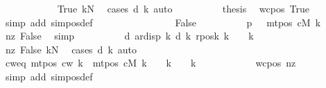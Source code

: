 \begin{isabellebody}
\ \ \ \ \ \ \ \ \ \ \isamarkupfalse%
\ True\ kN\ \isamarkupfalse%
\ {\isacharparenleft}{\kern0pt}cases\ {\isachardoublequoteopen}d\ k{\isachardoublequoteclose}{\isacharparenright}{\kern0pt}\ auto\isanewline
\ \ \ \ \ \ \ \ \isamarkupfalse%
\ {\isacharquery}{\kern0pt}thesis\ \isamarkupfalse%
\ wcpos\ True\ \isamarkupfalse%
\ {\isacharparenleft}{\kern0pt}simp\ add{\isacharcolon}{\kern0pt}\ sim{\isacharunderscore}{\kern0pt}pos{\isacharunderscore}{\kern0pt}def{\isacharparenright}{\kern0pt}\isanewline
\ \ \ \ \ \ \isamarkupfalse%
\isanewline
\ \ \ \ \ \ \ \ \isamarkupfalse%
\ False\isanewline
\ \ \ \ \ \ \ \ \isamarkupfalse%
\ p{}{\isacharcolon}{\kern0pt}\ {\isachardoublequoteopen}{}\ {\isasymle}\ mt{\isacharunderscore}{\kern0pt}pos\ cM\ k{\isachardoublequoteclose}\ \isamarkupfalse%
\ nz\ False\ \isamarkupfalse%
\ simp\isanewline
\ \ \ \ \ \ \ \ \isamarkupfalse%
\ d{}{\isacharcolon}{\kern0pt}\ {\isachardoublequoteopen}ar{\isacharunderscore}{\kern0pt}disp\ {\isacharquery}{\kern0pt}k\ {\isacharparenleft}{\kern0pt}d\ k{\isacharparenright}{\kern0pt}\ {\isacharparenleft}{\kern0pt}{\isacharquery}{\kern0pt}rposk\ k{\isacharparenright}{\kern0pt}\ {\isasymle}\ {}\ {\isacharasterisk}{\kern0pt}\ {\isacharquery}{\kern0pt}k{\isachardoublequoteclose}\isanewline
\ \ \ \ \ \ \ \ \ \ \isamarkupfalse%
\ nz\ False\ kN\ \isamarkupfalse%
\ {\isacharparenleft}{\kern0pt}cases\ {\isachardoublequoteopen}d\ k{\isachardoublequoteclose}{\isacharparenright}{\kern0pt}\ auto\isanewline
\ \ \ \ \ \ \ \ \isamarkupfalse%
\ cw{\isacharunderscore}{\kern0pt}eq{\isacharcolon}{\kern0pt}\ {\isachardoublequoteopen}mt{\isacharunderscore}{\kern0pt}pos\ c{\isacharunderscore}{\kern0pt}w\ k\ {\isacharequal}{\kern0pt}\ {\isacharparenleft}{\kern0pt}mt{\isacharunderscore}{\kern0pt}pos\ cM\ k\ {\isacharminus}{\kern0pt}\ {}{\isacharparenright}{\kern0pt}\ {\isacharasterisk}{\kern0pt}\ {\isacharquery}{\kern0pt}k\ {\isacharplus}{\kern0pt}\ {}\ {\isacharplus}{\kern0pt}\ {\isacharquery}{\kern0pt}k{\isachardoublequoteclose}\isanewline
\ \ \ \ \ \ \ \ \ \ \isamarkupfalse%
\ wcpos\ nz\ \isamarkupfalse%
\ {\isacharparenleft}{\kern0pt}simp\ add{\isacharcolon}{\kern0pt}\ sim{\isacharunderscore}{\kern0pt}pos{\isacharunderscore}{\kern0pt}def{\isacharparenright}{\kern0pt}\isanewline

\end{isabellebody}

